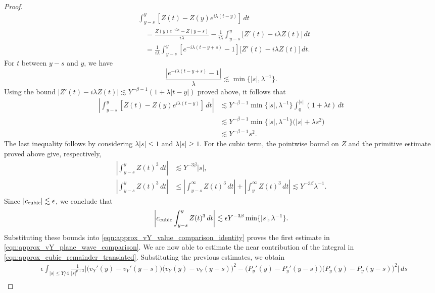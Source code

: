 \documentclass[11pt]{amsart}
\theoremstyle{definition}
\theoremstyle{remark}
\numberwithin{equation}{section}
\begin{document}
\begin{proof}
\begin{align*}
        &\int_{y-s}^{y}\left[Z(t)-Z(y)e^{i\lambda(t-y)}\right]\,dt\\
        &\quad=\frac{Z(y)e^{-i\lambda s}-Z(y-s)}{i\lambda}
        -\frac{1}{i\lambda}\int_{y-s}^{y}\bigl[Z'(t)-i\lambda Z(t)\bigr]\,dt\\
        &\quad=\frac{1}{i\lambda}\int_{y-s}^{y}
        \left[e^{-i\lambda(t-y+s)}-1\right]\bigl[Z'(t)-i\lambda Z(t)\bigr]\,dt.
    \end{align*}
    For $t$ between $y-s$ and $y$, we have
    \[\frac{|e^{-i\lambda(t-y+s)}-1|}{\lambda}
    \lesssim\min\{|s|,\lambda^{-1}\}.\]
    Using the bound $|Z'(t)-i\lambda Z(t)|\lesssim Y^{-\beta-1}(1+\lambda|t-y|)$ proved above, it follows that
    \begin{align*}
        \left|\int_{y-s}^{y}\left[Z(t)-Z(y)e^{i\lambda(t-y)}\right]\,dt\right|
        &\lesssim Y^{-\beta-1}\min\{|s|,\lambda^{-1}\}
        \int_0^{|s|}(1+\lambda t)\,dt\\
        &\lesssim Y^{-\beta-1}\min\{|s|,\lambda^{-1}\}
        \bigl(|s|+\lambda s^2\bigr)\\
        &\lesssim Y^{-\beta-1}s^2.
    \end{align*}
    The last inequality follows by considering $\lambda|s|\leq1$ and $\lambda|s|\geq1$. For the cubic term, the pointwise bound on $Z$ and the primitive estimate proved above give, respectively,
    \begin{align*}
        \left|\int_{y-s}^{y}Z(t)^3\,dt\right|
        &\lesssim Y^{-3\beta}|s|,\\
        \left|\int_{y-s}^{y}Z(t)^3\,dt\right|
        &\leq\left|\int_{y-s}^{\infty}Z(t)^3\,dt\right|
        +\left|\int_y^{\infty}Z(t)^3\,dt\right| \lesssim Y^{-3\beta}\lambda^{-1}.
    \end{align*}
    Since $|c_{\textup{cubic}}|\lesssim\epsilon$, we conclude that
    \[\left|c_{\textup{cubic}}\int_{y-s}^{y}Z(t)^3\,dt\right|
    \lesssim\epsilon Y^{-3\beta}\min\{|s|,\lambda^{-1}\}.\]
    Substituting these bounds into \eqref{eqn:approx_vY_value_comparison_identity} proves the first estimate in \eqref{eqn:approx_vY_plane_wave_comparison}. We are now able to estimate the near contribution of the integral in \eqref{eqn:approx_cubic_remainder_translated}. Substituting the previous estimates, we obtain
    \begin{equation}\label{eqn:approx_cubic_near_bound}
        \begin{aligned}
            &\epsilon\int_{|s|\leq Y/4}\frac{1}{|s|^{p+3}}\Big|
            \bigl(v_Y'(y)-v_Y'(y-s)\bigr)\bigl(v_Y(y)-v_Y(y-s)\bigr)^2 -\bigl(P_y'(y)-P_y'(y-s)\bigr)\bigl(P_y(y)-P_y(y-s)\bigr)^2\Big|\,ds\\

\end{aligned}
\end{equation}
\end{proof}
\end{document}
